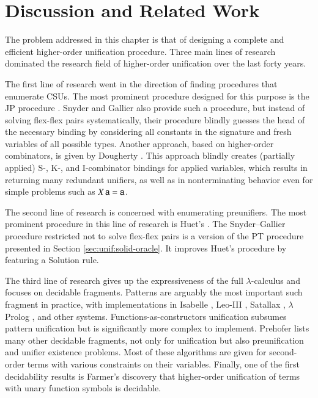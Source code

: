 \section{Discussion and Related Work}
The problem addressed in this chapter is that of designing
a complete and efficient higher-order unification procedure. Three main lines of
research dominated the research field of higher-order unification over the last forty years. 

The first line of research went in the direction of finding procedures that
enumerate CSUs. The most prominent procedure designed for
this purpose is the JP procedure \cite{jp-76-unif}. Snyder and Gallier
\cite{sg-89-unif} also provide such a procedure,
but instead of solving
flex-flex pairs systematically, their procedure blindly guesses the head of the necessary
binding by considering all constants in the signature and fresh variables of all
possible types. Another approach, based on higher-order combinators, is given by
Dougherty \cite{dd-93-comb-unif}. This approach blindly creates (partially
applied) \textsf{S}-, \textsf{K}-, and \textsf{I}-combinator bindings for applied
variables, which results in returning many redundant unifiers, as well as in
nonterminating behavior even for simple problems such as $X \, \mathsf{a} =
\mathsf{a}$.

The second line of research is concerned with enumerating
preunifiers. The most prominent procedure in this line of research is Huet's 
\cite{gh-75-unification}. The Snyder--Gallier procedure restricted not to solve flex-flex pairs
is a version of the PT procedure presented in Section \ref{sec:unif:solid-oracle}. It improves 
Huet's procedure by featuring a \textsf{Solution} rule.

The third line of research gives up the expressiveness of the full
$\lambda$-calculus and focuses on decidable fragments. Patterns
\cite{tn-93-patterns} are arguably the most important such fragment in practice,
with implementations
in Isabelle \cite{tn-02-isabelle}, Leo-III \cite{sb-21-leo3}, Satallax
\cite{cb-12-satallax}, $\lambda$Prolog \cite{dm-12-lprolog}, and other systems.
Functions-as-constructors \cite{tl-16-facunif} unification subsumes pattern
unification but is significantly more complex to implement. Prehofer
\cite{cp-95-unifphd} lists many other decidable fragments, not only for
unification but also preunification and unifier existence problems. Most of
these algorithms are given for second-order terms with various constraints on
their variables. Finally, one of the first decidability results is Farmer's discovery \cite{wf-88-monadicunif} that
higher-order unification of terms with unary function symbols is decidable.

